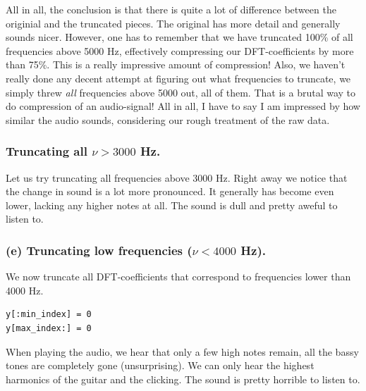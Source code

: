 \documentclass[a4paper, 11pt, notitlepage, english]{article}
\begin{document}
All in all, the conclusion is that there is quite a lot of difference between the originial and the truncated pieces. The original has more detail and generally sounds nicer. However, one has to remember that we have truncated 100\% of all frequencies above 5000 Hz, effectively compressing our DFT-coefficients by more than 75\%. This is a really impressive amount of compression! Also, we haven't really done any decent attempt at figuring out what frequencies to truncate, we simply threw \emph{all} frequencies above 5000 out, all of them. That is a brutal way to do compression of an audio-signal! All in all, I have to say I am impressed by how similar the audio sounds, considering our rough treatment of the raw data.

\subsubsection*{Truncating all $\nu > 3000$ Hz.}

Let us try truncating all frequencies above 3000 Hz. Right away we notice that the change in sound is a lot more pronounced. It generally has become even lower, lacking any higher notes at all. The sound is dull and pretty aweful to listen to.

\subsubsection*{(e) Truncating low frequencies ($\nu < 4000$ Hz).}

We now truncate all DFT-coefficients that correspond to frequencies lower than 4000 Hz.
\begin{lstlisting}
y[:min_index] = 0
y[max_index:] = 0    
\end{lstlisting}

When playing the audio, we hear that only a few high notes remain, all the bassy tones are completely gone (unsurprising). We can only hear the highest harmonics of the guitar and the clicking. The sound is pretty horrible to listen to.
\end{document}
